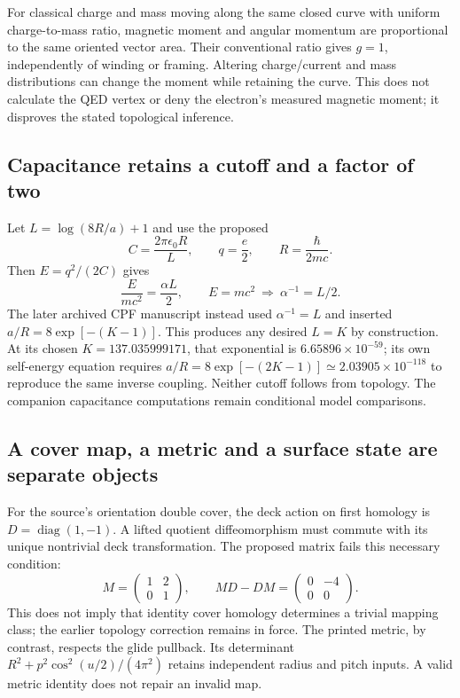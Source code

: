 \documentclass[11pt]{article}
\begin{document}
For classical charge and mass moving along the same closed curve with
uniform charge-to-mass ratio, magnetic moment and angular momentum are
proportional to the same oriented vector area. Their conventional ratio
gives $g=1$, independently of winding or framing. Altering charge/current
and mass distributions can change the moment while retaining the curve.
This does not calculate the QED vertex or deny the electron's measured
magnetic moment; it disproves the stated topological inference.

\subsection{Capacitance retains a cutoff and a factor of two}
Let $L=\log(8R/a)+1$ and use the proposed
\begin{equation}
 C=\frac{2\pi\epsilon_0R}{L},\qquad
 q=\frac e2,\qquad R=\frac{\hbar}{2mc}.
\end{equation}
Then $E=q^2/(2C)$ gives
\begin{equation}
 \frac{E}{mc^2}=\frac{\alpha L}{2},\qquad
 E=mc^2\ \Longrightarrow\ \alpha^{-1}=L/2.
\end{equation}
The later archived CPF manuscript instead used $\alpha^{-1}=L$ and
inserted $a/R=8\exp[-(K-1)]$. This produces any desired $L=K$ by
construction. At its chosen $K=137.035999171$, that exponential is
$6.65896\times10^{-59}$; its own self-energy equation requires
$a/R=8\exp[-(2K-1)]\simeq2.03905\times10^{-118}$ to reproduce the
same inverse coupling. Neither cutoff follows from topology. The
companion capacitance computations remain conditional model comparisons.

\subsection{A cover map, a metric and a surface state are separate objects}
For the source's orientation double cover, the deck action on first
homology is $D=\operatorname{diag}(1,-1)$. A lifted quotient
diffeomorphism must commute with its unique nontrivial deck transformation.
The proposed matrix fails this necessary condition:
\begin{equation}
 M=\begin{pmatrix}1&2\\0&1\end{pmatrix},\qquad
 MD-DM=\begin{pmatrix}0&-4\\0&0\end{pmatrix}.
\end{equation}
This does not imply that identity cover homology determines a trivial
mapping class; the earlier topology correction remains in force.
The printed metric, by contrast, respects the glide pullback. Its
determinant $R^2+p^2\cos^2(u/2)/(4\pi^2)$ retains independent radius
and pitch inputs. A valid metric identity does not repair an invalid map.
\end{document}
